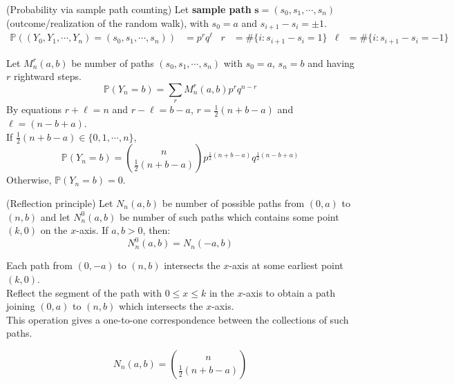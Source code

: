 \documentclass{huhtakm-template-book}
\newcommand{\prob}{\mathbb{P}}
\begin{document}
\begin{eg}(Probability via sample path counting)
	Let \textbf{sample path} $\mathbf{s}=(s_{0},s_{1},\cdots,s_{n})$ (outcome/realization of the random walk), with $s_{0}=a$ and $s_{i+1}-s_{i}=\pm 1$.
	\begin{align*}
		\prob((Y_{0},Y_{1},\cdots,Y_{n})=(s_{0},s_{1},\cdots,s_{n}))&=p^{r}q^{\ell} & r&=\#\{i:s_{i+1}-s_{i}=1\} & \ell&=\#\{i:s_{i+1}-s_{i}=-1\}
	\end{align*}
\end{eg}
\begin{eg}
	Let $M_{n}^{r}(a,b)$ be number of paths $(s_{0},s_{1},\cdots,s_{n})$ with $s_{0}=a$, $s_{n}=b$ and having $r$ rightward steps.
	\begin{equation*}
		\prob(Y_{n}=b)=\sum_{r} M_{n}^{r}(a,b)p^{r}q^{n-r}
	\end{equation*}
	By equations $r+\ell=n$ and $r-\ell=b-a$, $r=\frac{1}{2}(n+b-a)$ and $\ell=(n-b+a)$.\\
	If $\frac{1}{2}(n+b-a)\in\{0,1,\cdots,n\}$,
	\begin{equation*}
		\prob(Y_{n}=b)=\binom{n}{\frac{1}{2}(n+b-a)}p^{\frac{1}{2}(n+b-a)}q^{\frac{1}{2}(n-b+a)}
	\end{equation*}
	Otherwise, $\prob(Y_{n}=b)=0$.
\end{eg}
\begin{thm}(Reflection principle)
	Let $N_{n}(a,b)$ be number of possible paths from $(0,a)$ to $(n,b)$ and let $N_{n}^{0}(a,b)$ be number of such paths which contains some point $(k,0)$ on the $x$-axis. If $a,b>0$, then:
	\begin{equation*}
		N_{n}^{0}(a,b)=N_{n}(-a,b)
	\end{equation*}
\end{thm}
\begin{proofing}
	Each path from $(0,-a)$ to $(n,b)$ intersects the $x$-axis at some earliest point $(k,0)$.\\
	Reflect the segment of the path with $0\leq x\leq k$ in the $x$-axis to obtain a path joining $(0,a)$ to $(n,b)$ which intersects the $x$-axis.\\
	This operation gives a one-to-one correspondence between the collections of such paths.
\end{proofing}
\begin{lem}
	\label{Appendix A (Lemma) Number of paths calculation}
	\begin{equation*}
		N_{n}(a,b)=\binom{n}{\frac{1}{2}(n+b-a)}
	\end{equation*}
\end{lem}
\end{document}

